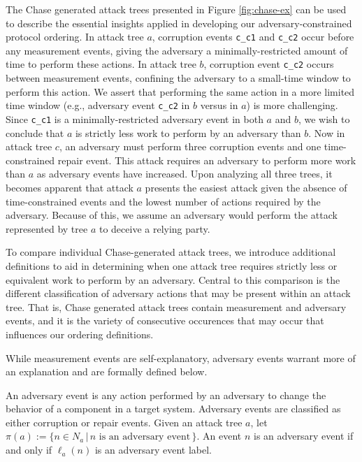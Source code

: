 \documentclass[runningheads]{llncs}
\theoremstyle{definition}
\begin{document}
The Chase generated attack trees presented in Figure \ref{fig:chase-ex} can be used to describe the essential insights applied in developing our adversary-constrained protocol ordering. In attack tree $a$, corruption events \texttt{c\_c1} and \texttt{c\_c2} occur before any measurement events, giving the adversary a minimally-restricted amount of time to perform these actions. In attack tree $b$, corruption event \texttt{c\_c2} occurs between measurement events, confining the adversary to a small-time window to perform this action. We assert that performing the same action in a more limited time window (e.g., adversary event \texttt{c\_c2} in $b$ versus in $a$) is more challenging. Since \texttt{c\_c1} is a minimally-restricted adversary event in both $a$ and $b$, we wish to conclude that $a$ is strictly less work to perform by an adversary than $b$. Now in attack tree $c$, an adversary must perform three corruption events and one time-constrained repair event. This attack requires an adversary to perform more work than $a$ as adversary events have increased. Upon analyzing all three trees, it becomes apparent that attack $a$ presents the easiest attack given the absence of time-constrained events and the lowest number of actions required by the adversary. Because of this, we assume an adversary would perform the attack represented by tree $a$ to deceive a relying party. 

To compare individual Chase-generated attack trees, we introduce additional definitions to aid in determining when one attack tree requires strictly less or equivalent work to perform by an adversary. Central to this comparison is the different classification of adversary actions that may be present within an attack tree. That is, Chase generated attack trees contain measurement and adversary events, and it is the variety of consecutive occurences that may occur that influences our ordering definitions. 

While measurement events are self-explanatory, adversary events warrant more of an explanation and are formally defined below.
 

\begin{definition}
    An adversary event is any action performed by an adversary to change the behavior of a component in a target system. Adversary events are classified as either corruption or repair events. Given an attack tree $a$, let $\pi(a) := \{n \in N_a \,|\, n \text{ is an adversary event}\,\}$. An event $n$ is an adversary event if and only if $\ell_a(n)$ is an adversary event label.
\end{definition}
\end{document}
